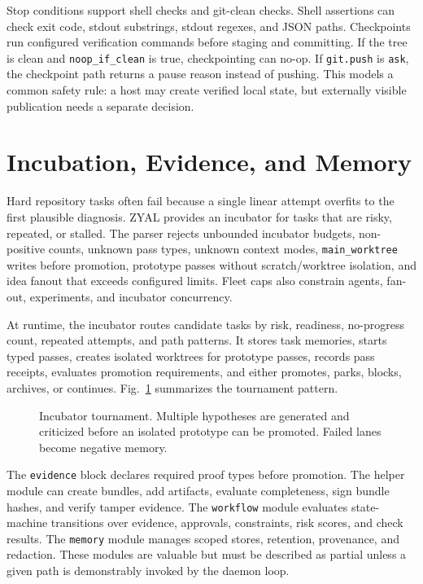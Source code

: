 \documentclass[conference]{IEEEtran}
\newcommand{\ZYAL}{ZYAL}
\begin{document}
Stop conditions support shell checks and git-clean checks. Shell assertions can check exit code, stdout substrings, stdout regexes, and JSON paths. Checkpoints run configured verification commands before staging and committing. If the tree is clean and \texttt{noop\_if\_clean} is true, checkpointing can no-op. If \texttt{git.push} is \texttt{ask}, the checkpoint path returns a pause reason instead of pushing. This models a common safety rule: a host may create verified local state, but externally visible publication needs a separate decision.

\section{Incubation, Evidence, and Memory}

Hard repository tasks often fail because a single linear attempt overfits to the first plausible diagnosis. \ZYAL{} provides an incubator for tasks that are risky, repeated, or stalled. The parser rejects unbounded incubator budgets, non-positive counts, unknown pass types, unknown context modes, \texttt{main\_worktree} writes before promotion, prototype passes without scratch/worktree isolation, and idea fanout that exceeds configured limits. Fleet caps also constrain agents, fan-out, experiments, and incubator concurrency.

At runtime, the incubator routes candidate tasks by risk, readiness, no-progress count, repeated attempts, and path patterns. It stores task memories, starts typed passes, creates isolated worktrees for prototype passes, records pass receipts, evaluates promotion requirements, and either promotes, parks, blocks, archives, or continues. Fig.~\ref{fig:incubator} summarizes the tournament pattern.

\begin{figure}[t]
\centering
\resizebox{\textwidth}{!}{}
\caption{Incubator tournament. Multiple hypotheses are generated and criticized before an isolated prototype can be promoted. Failed lanes become negative memory.}
\label{fig:incubator}
\end{figure}

The \texttt{evidence} block declares required proof types before promotion. The helper module can create bundles, add artifacts, evaluate completeness, sign bundle hashes, and verify tamper evidence. The \texttt{workflow} module evaluates state-machine transitions over evidence, approvals, constraints, risk scores, and check results. The \texttt{memory} module manages scoped stores, retention, provenance, and redaction. These modules are valuable but must be described as partial unless a given path is demonstrably invoked by the daemon loop.
\end{document}
